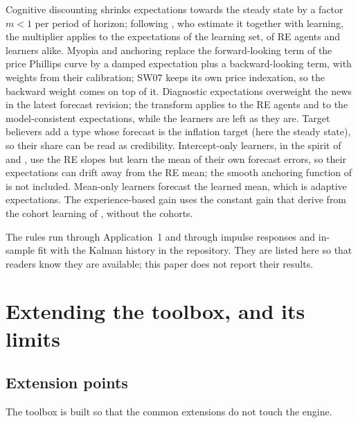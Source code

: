 \documentclass[pdflatex,sn-basic]{sn-jnl}
\begin{document}
Cognitive discounting \citep{gabaix2020} shrinks expectations towards the steady state by a factor
$m<1$ per period of horizon; following \citet{meggiorini2021}, who estimate it together with
learning, the multiplier applies to the expectations of the learning set, of RE agents and
learners alike. Myopia and anchoring \citep{angeletos2021} replace the forward-looking term of the
price Phillips curve by a damped expectation plus a backward-looking term, with weights from their
calibration; SW07 keeps its own price indexation, so the backward weight comes on top of it.
Diagnostic expectations \citep{bordalo2018,lhuillier2024} overweight the news in the latest
forecast revision; the transform applies to the RE agents and to the model-consistent
expectations, while the learners are left as they are. Target believers \citep{hommes2019} add a
type whose forecast is the inflation target (here the steady state), so their share can be read as
credibility. Intercept-only learners, in the spirit of \citet{gati2023} and \citet{carvalho2023},
use the RE slopes but learn the mean of their own forecast errors, so their expectations can drift
away from the RE mean; the smooth anchoring function of \citet{gati2023} is not included.
Mean-only learners forecast the learned mean, which is adaptive expectations. The experience-based
gain uses the constant gain that \citet{nagel2022} derive from the cohort learning of
\citet{malmendier2016}, without the cohorts.

The rules run through Application~1 and through impulse responses and in-sample fit with the Kalman
history in the repository. They are listed here so that readers know they are available; this
paper does not report their results.

\section{Extending the toolbox, and its limits}\label{sec:extend}

\subsection{Extension points}\label{sec:extpoints}

The toolbox is built so that the common extensions do not touch the engine.
\end{document}

